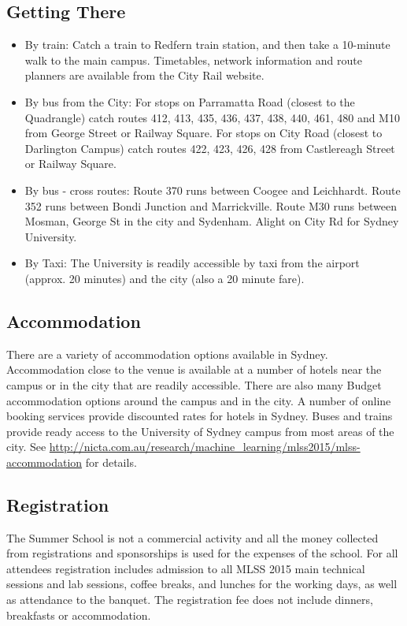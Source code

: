 \subsection*{Getting There}
\begin{itemize}
 \item By train: Catch a train to Redfern train station, and then take a 10-minute walk to the main campus. Timetables, network information and route planners are available from the City Rail website.
\item By bus from the City: For stops on Parramatta Road (closest to the Quadrangle) catch routes 412, 413, 435, 436, 437, 438, 440, 461, 480 and M10 from George Street or Railway Square.
For stops on City Road (closest to Darlington Campus) catch routes 422, 423, 426, 428 from Castlereagh Street or Railway Square.
\item By bus - cross routes: Route 370 runs between Coogee and Leichhardt. 
Route 352 runs between Bondi Junction and Marrickville.
Route M30 runs between Mosman, George St in the city and Sydenham. Alight on City Rd for Sydney University.
\item By Taxi: The University is readily accessible by taxi from the airport (approx. 20 minutes) and the city (also a 20 minute fare).
\end{itemize}
%
{}
\subsection*{Accommodation}
There are a variety of accommodation options available in Sydney. Accommodation close to the  venue is available
at a number of hotels near the campus or in the city that are readily accessible. 
There are also many Budget accommodation options around the campus and in the city. A number of online booking services provide discounted rates for hotels in Sydney. Buses and trains provide ready access to the University of Sydney campus from most areas of the city. See \url{http://nicta.com.au/research/machine_learning/mlss2015/mlss-accommodation} for details.
%
{}
\subsection*{Registration}
The Summer School is not a commercial activity and all the money collected from registrations and sponsorships is used for the expenses 
of the school. For all attendees registration includes admission to all MLSS 2015 main technical sessions
and lab sessions, coffee breaks, and lunches for the working days, 
as well as attendance to the banquet. 
The registration fee does not include dinners, breakfasts or accommodation. 
%
%
\newpage
{}
{}
